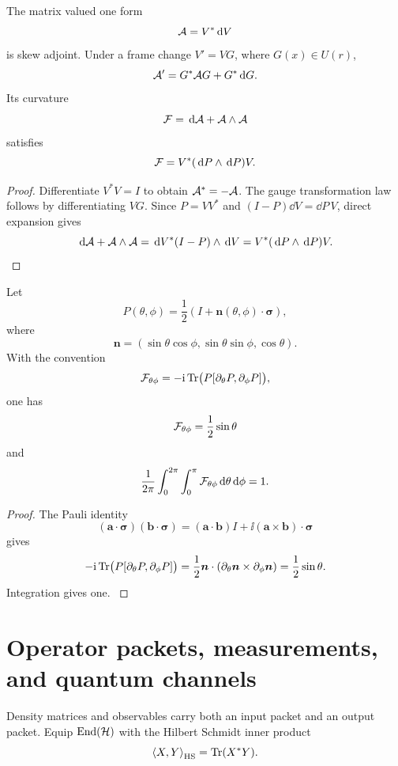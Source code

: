 \begin{theorem}\label{strong:theorem:018}\label{strong:thm:nonabelian_connection}
The matrix valued one form
\[
\mathcal A=V^*\,\mathrm d V
\]
is skew adjoint. Under a frame change \(V'=VG\), where \(G(x)\in U(r)\),
\[
\mathcal A'
=
G^*\mathcal A G+G^*\,\mathrm d G.
\]
Its curvature
\[
\mathcal F=\,\mathrm d\mathcal A+\mathcal A\wedge\mathcal A
\]
satisfies
\[
\mathcal F=V^*(\,\mathrm d P\wedge\,\mathrm d P)V.
\]
\end{theorem}

\begin{proof}\label{strong:proof:027}
Differentiate \(V^*V=I\) to obtain \(\mathcal A^*=-\mathcal A\). The gauge transformation law follows by differentiating \(VG\). Since \(P=VV^*\) and \((I-P)\dd V=\dd P\,V\), direct expansion gives
\[
\,\mathrm d\mathcal A+\mathcal A\wedge\mathcal A
=
\,\mathrm d V^*(I-P)\wedge\,\mathrm d V
=
V^*(\,\mathrm d P\wedge\,\mathrm d P)V.
\]
\label{strong:proof:027:end}\end{proof}

\begin{corollary}\label{strong:corollary:007}\label{strong:cor:bloch_curvature}
Let
\[
P(\theta,\phi)
=
\frac12\left(I+\bm n(\theta,\phi)\cdot\bm\sigma\right),
\]
where
\[
\bm n=(\sin\theta\cos\phi,\sin\theta\sin\phi,\cos\theta).
\]
With the convention
\[
\mathcal F_{\theta\phi}
=-\mathrm i\operatorname{Tr}\bigl(P[\partial_\theta P,\partial_\phi P]\bigr),
\]
one has
\[
\mathcal F_{\theta\phi}=\frac12\sin\theta
\]
and
\[
\frac1{2\pi}
\int_0^{2\pi}\int_0^\pi
\mathcal F_{\theta\phi}\,\mathrm d\theta\,\mathrm d\phi
=1.
\]
\end{corollary}

\begin{proof}\label{strong:proof:028}
The Pauli identity
\[
(\bm a\cdot\bm\sigma)(\bm b\cdot\bm\sigma)
=(\bm a\cdot\bm b)I
+\ii(\bm a\times\bm b)\cdot\bm\sigma
\]
gives
\[
-\mathrm i\operatorname{Tr}\bigl(P[\partial_\theta P,\partial_\phi P]\bigr)
=\frac12
\bm n\cdot
(\partial_\theta\bm n\times\partial_\phi\bm n)
=\frac12\sin\theta.
\]
Integration gives one.
\label{strong:proof:028:end}\end{proof}

\section{Operator packets, measurements, and quantum channels}\label{strong:section:007}\label{strong:sec:channels}

Density matrices and observables carry both an input packet and an output packet. Equip \(\operatorname{End}(\mathcal H)\) with the Hilbert Schmidt inner product
\[
\left\langle X,Y\right\rangle_{\mathrm{HS}}=\operatorname{Tr}(X^*Y).
\]

